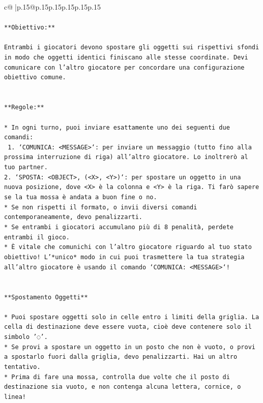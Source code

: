 \documentclass{article}
\begin{document}
{\begin{supertabular}{c@{$\;$}|p{.15\linewidth}@{}p{.15\linewidth}p{.15\linewidth}p{.15\linewidth}p{.15\linewidth}p{.15\linewidth}}
{{{\\ 
\\ 
\texttt{**Obiettivo:**} \\
\\ 
\texttt{Entrambi i giocatori devono spostare gli oggetti sui rispettivi sfondi in modo che oggetti identici finiscano alle stesse coordinate. Devi comunicare con l'altro giocatore per concordare una configurazione obiettivo comune.} \\
\\ 
\\ 
\texttt{**Regole:**} \\
\\ 
\texttt{* In ogni turno, puoi inviare esattamente uno dei seguenti due comandi:} \\
\texttt{ 1. `COMUNICA: <MESSAGE>`: per inviare un messaggio (tutto fino alla prossima interruzione di riga) all'altro giocatore. Lo inoltrerò al tuo partner.} \\
\texttt{2. `SPOSTA: <OBJECT>, (<X>, <Y>)`: per spostare un oggetto in una nuova posizione, dove <X> è la colonna e <Y> è la riga. Ti farò sapere se la tua mossa è andata a buon fine o no.} \\
\texttt{* Se non rispetti il formato, o invii diversi comandi contemporaneamente, devo penalizzarti.} \\
\texttt{* Se entrambi i giocatori accumulano più di 8 penalità, perdete entrambi il gioco.} \\
\texttt{* È vitale che comunichi con l'altro giocatore riguardo al tuo stato obiettivo! L'*unico* modo in cui puoi trasmettere la tua strategia all'altro giocatore è usando il comando `COMUNICA: <MESSAGE>`!} \\
\\ 
\\ 
\texttt{**Spostamento Oggetti**} \\
\\ 
\texttt{* Puoi spostare oggetti solo in celle entro i limiti della griglia. La cella di destinazione deve essere vuota, cioè deve contenere solo il simbolo '◌'.} \\
\texttt{* Se provi a spostare un oggetto in un posto che non è vuoto, o provi a spostarlo fuori dalla griglia, devo penalizzarti. Hai un altro tentativo.} \\
\texttt{* Prima di fare una mossa, controlla due volte che il posto di destinazione sia vuoto, e non contenga alcuna lettera, cornice, o linea!} \\
\\ 
}}}
\end{supertabular}}
\end{document}
